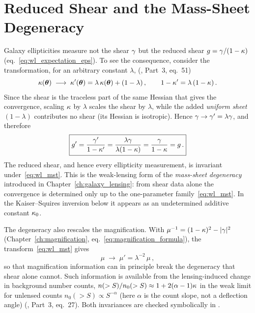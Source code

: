 \section{Reduced Shear and the Mass-Sheet Degeneracy}
\label{sec:wl_reduced_shear}

Galaxy ellipticities measure not the shear $\gamma$ but the
reduced shear $g = \gamma/(1 - \kappa)$
(eq.~\ref{eq:wl_expectation_eps}).  To see the consequence,
consider the transformation, for an arbitrary constant $\lambda$,
(\citealp{schneider_kochanek_wambsganss_2006}, Part~3, eq.~51)
\begin{equation}
    \kappa(\boldsymbol{\theta}) \;\longrightarrow\;
    \kappa'(\boldsymbol{\theta}) = \lambda\,\kappa(\boldsymbol{\theta}) + (1 - \lambda)\,,
    \qquad
    1 - \kappa' = \lambda\,(1 - \kappa)\,.
    \label{eq:wl_mst}
\end{equation}
Since the shear is the traceless part of the same Hessian that gives the
convergence, scaling $\kappa$ by $\lambda$ scales the shear by $\lambda$,
while the added \textit{uniform sheet} $(1-\lambda)$ contributes no shear
(its Hessian is isotropic).  Hence $\gamma \to \gamma' = \lambda\gamma$, and
therefore
\begin{equation}
    \boxed{
    g' = \frac{\gamma'}{1 - \kappa'}
    = \frac{\lambda\gamma}{\lambda(1 - \kappa)}
    = \frac{\gamma}{1 - \kappa} = g\,.
    }
    \label{eq:wl_g_invariant}
\end{equation}
The reduced shear, and hence every ellipticity measurement, is
invariant under~\eqref{eq:wl_mst}.  This is the weak-lensing form
of the \emph{mass-sheet degeneracy} introduced in
Chapter~\ref{ch:galaxy_lensing}: from shear data alone the convergence is
determined only up to the one-parameter family~\eqref{eq:wl_mst}.  In the
Kaiser--Squires inversion below it appears as an undetermined additive
constant $\kappa_0$.

The degeneracy also rescales the magnification.  With
$\mu^{-1} = (1 - \kappa)^2 - |\gamma|^2$
(Chapter~\ref{ch:magnification},
eq.~\ref{eq:magnification_formula}), the transform~\eqref{eq:wl_mst} gives
\begin{equation}
    \mu \;\longrightarrow\; \mu' = \lambda^{-2}\,\mu\,,
    \label{eq:wl_mu_rescale}
\end{equation}
so that magnification information can in principle break the degeneracy
that shear alone cannot.  Such information is available from the
lensing-induced change in background number counts,
$n(>S)/n_0(>S) \approx 1 + 2(\alpha - 1)\kappa$ in the weak limit for
unlensed counts $n_0(>S) \propto S^{-\alpha}$ (here $\alpha$ is the count
slope, not a deflection angle)
(\citealp{schneider_kochanek_wambsganss_2006}, Part~3, eq.~27).  Both
invariances are checked symbolically in
.



